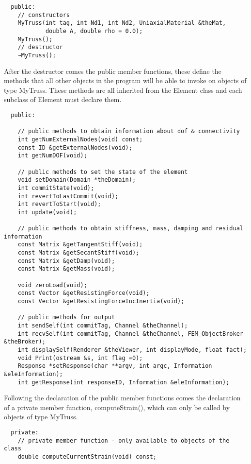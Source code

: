 \documentclass[12pt]{article}
\begin{document}
{\sf\small \begin{verbatim}
  public:
    // constructors
    MyTruss(int tag, int Nd1, int Nd2, UniaxialMaterial &theMat,
            double A, double rho = 0.0); 
    MyTruss();    
    // destructor
    ~MyTruss();
\end{verbatim} }

After the destructor comes the public member functions, these define
the methods that all other objects in the program will be able to
invoke on objects of type MyTruss. These methods are all inherited
from the Element class and each subclass of Element must declare them.

{\sf\small \begin{verbatim}
  public:

    // public methods to obtain information about dof & connectivity
    int getNumExternalNodes(void) const;
    const ID &getExternalNodes(void);
    int getNumDOF(void);

    // public methods to set the state of the element
    void setDomain(Domain *theDomain);
    int commitState(void);
    int revertToLastCommit(void);        
    int revertToStart(void);        
    int update(void);

    // public methods to obtain stiffness, mass, damping and residual information
    const Matrix &getTangentStiff(void);
    const Matrix &getSecantStiff(void);    
    const Matrix &getDamp(void);    
    const Matrix &getMass(void);    

    void zeroLoad(void);	
    const Vector &getResistingForce(void);
    const Vector &getResistingForceIncInertia(void);            

    // public methods for output
    int sendSelf(int commitTag, Channel &theChannel);
    int recvSelf(int commitTag, Channel &theChannel, FEM_ObjectBroker &theBroker);
    int displaySelf(Renderer &theViewer, int displayMode, float fact);    
    void Print(ostream &s, int flag =0);    
    Response *setResponse(char **argv, int argc, Information &eleInformation);
    int getResponse(int responseID, Information &eleInformation);
\end{verbatim} }

Following the declaration of the public member functions comes the
declaration of a private member function, {\sf computeStrain()}, which
can only be called by objects of type MyTruss.

{\sf\small \begin{verbatim}    
  private:
    // private member function - only available to objects of the class
    double computeCurrentStrain(void) const;
\end{verbatim} }
\end{document}
